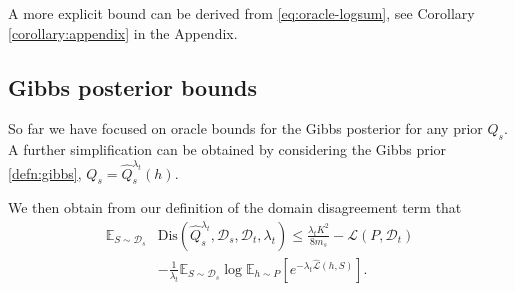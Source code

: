 \documentclass{article}
\theoremstyle{plain}
\newtheorem{corollary}[theorem]{Corollary}
\theoremstyle{definition}
\theoremstyle{remark}
\begin{document}


A more explicit bound can be derived from \eqref{eq:oracle-logsum}, see Corollary \ref{corollary:appendix} in the Appendix.
%
%
\subsection{Gibbs posterior bounds}
So far we have focused on oracle bounds for the Gibbs posterior for any prior $Q_s$. A further simplification can be obtained by considering the Gibbs prior \eqref{defn:gibbs},  $Q_s=\hat{Q}^{\lambda_t}_{s}(h).$

We then obtain from our definition of the domain disagreement term that  
\begin{equation*}
\begin{split}
    \mathbb{E}_{S\sim \mathcal{D}_s}&\mathrm{Dis}(\hat{Q}^{\lambda_t}_{s},\mathcal{D}_s, \mathcal{D}_t, \lambda_t )\leq \frac{\lambda_t K^2}{8m_s} -\mathcal{L}(P,\mathcal{D}_t) \\&-\frac{1}{\lambda_t}\mathbb{E}_{S\sim \mathcal{D}_s}\log\mathbb{E}_{h\sim P}\left [e^{-\lambda_t\hat{\mathcal{L}}(h,S)} \right ].
\end{split}
\end{equation*}
\end{document}
